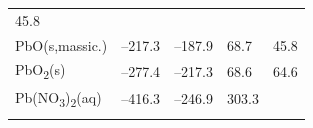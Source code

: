 \documentclass[
  9pt,
]{extbook}
\theoremstyle{definition}
\theoremstyle{definition}
\theoremstyle{definition}
\theoremstyle{remark}
\begin{document}
\begin{longtable}[]{@{}lllll@{}}
\begin{minipage}[t]{0.18\columnwidth}
45.8\strut
\end{minipage}\tabularnewline
\begin{minipage}[t]{0.10\columnwidth}\raggedright
PbO(s,massic.)\strut
\end{minipage} & \begin{minipage}[t]{0.19\columnwidth}\raggedright
--217.3\strut
\end{minipage} & \begin{minipage}[t]{0.20\columnwidth}\raggedright
--187.9\strut
\end{minipage} & \begin{minipage}[t]{0.18\columnwidth}\raggedright
68.7\strut
\end{minipage} & \begin{minipage}[t]{0.18\columnwidth}\raggedright
45.8\strut
\end{minipage}\tabularnewline
\begin{minipage}[t]{0.10\columnwidth}\raggedright
PbO\textsubscript{2}(s)\strut
\end{minipage} & \begin{minipage}[t]{0.19\columnwidth}\raggedright
--277.4\strut
\end{minipage} & \begin{minipage}[t]{0.20\columnwidth}\raggedright
--217.3\strut
\end{minipage} & \begin{minipage}[t]{0.18\columnwidth}\raggedright
68.6\strut
\end{minipage} & \begin{minipage}[t]{0.18\columnwidth}\raggedright
64.6\strut
\end{minipage}\tabularnewline
\begin{minipage}[t]{0.10\columnwidth}\raggedright
Pb(NO\textsubscript{3})\textsubscript{2}(aq)\strut
\end{minipage} & \begin{minipage}[t]{0.19\columnwidth}\raggedright
--416.3\strut
\end{minipage} & \begin{minipage}[t]{0.20\columnwidth}\raggedright
--246.9\strut
\end{minipage} & \begin{minipage}[t]{0.18\columnwidth}\raggedright
303.3\strut
\end{minipage} & \begin{minipage}[t]{0.18\columnwidth}\raggedright
\strut
\end{minipage}\tabularnewline
\begin{minipage}[t]{0.10\columnwidth}\raggedright

\end{minipage}
\end{longtable}
\end{document}
